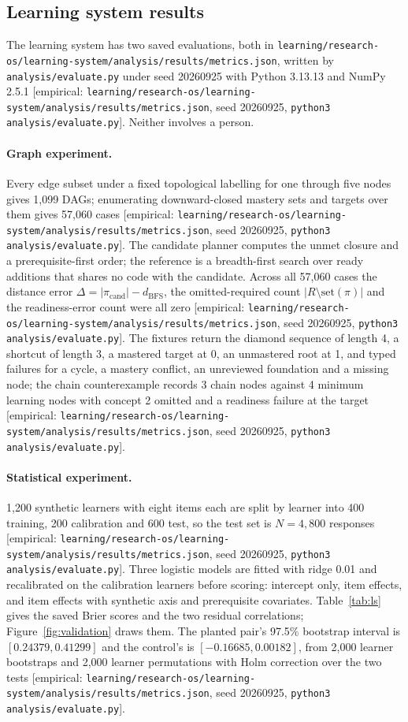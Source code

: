 \documentclass[11pt]{article}
\newcommand{\emp}[1]{\textcolor{bucketgray}{\footnotesize [empirical: #1]}}
\newcommand{\ls}{\emp{\texttt{learning/\allowbreak research-os/\allowbreak learning-system/\allowbreak analysis/\allowbreak results/\allowbreak metrics.\allowbreak json}, seed 20260925, \texttt{python3 analysis/\allowbreak evaluate.\allowbreak py}}}
\begin{document}
\subsection{Learning system results}
\label{sec:lsresults}

The learning system has two saved evaluations, both in \texttt{learning/\allowbreak research-os/\allowbreak learning-system/\allowbreak analysis/\allowbreak results/\allowbreak metrics.\allowbreak json}, written by \texttt{analysis/evaluate.py} under seed 20260925 with Python 3.13.13 and NumPy 2.5.1 \ls. Neither involves a person.

\paragraph{Graph experiment.}
Every edge subset under a fixed topological labelling for one through five nodes gives 1,099 DAGs; enumerating downward-closed mastery sets and targets over them gives 57,060 cases \ls. The candidate planner computes the unmet closure and a prerequisite-first order; the reference is a breadth-first search over ready additions that shares no code with the candidate. Across all 57,060 cases the distance error $\Delta = |\pi_{\mathrm{cand}}| - d_{\mathrm{BFS}}$, the omitted-required count $|R \setminus \mathrm{set}(\pi)|$ and the readiness-error count were all zero \ls. The fixtures return the diamond sequence of length 4, a shortcut of length 3, a mastered target at 0, an unmastered root at 1, and typed failures for a cycle, a mastery conflict, an unreviewed foundation and a missing node; the chain counterexample records 3 chain nodes against 4 minimum learning nodes with concept 2 omitted and a readiness failure at the target \ls.

\paragraph{Statistical experiment.}
1,200 synthetic learners with eight items each are split by learner into 400 training, 200 calibration and 600 test, so the test set is $N = 4{,}800$ responses \ls. Three logistic models are fitted with ridge 0.01 and recalibrated on the calibration learners before scoring: intercept only, item effects, and item effects with synthetic axis and prerequisite covariates. Table~\ref{tab:ls} gives the saved Brier scores and the two residual correlations; Figure~\ref{fig:validation} draws them. The planted pair's 97.5\% bootstrap interval is $[0.24379, 0.41299]$ and the control's is $[-0.16685, 0.00182]$, from 2,000 learner bootstraps and 2,000 learner permutations with Holm correction over the two tests \ls.
\end{document}
